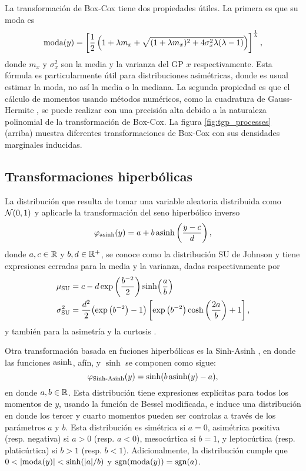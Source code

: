 La transformación de Box-Cox tiene dos propiedades útiles. La primera es que su moda es \cite{powernormal}
\begin{align*}
	\operatorname{moda}(y) = \left[\frac{1}{2} \left(1 + \lambda m_x + \sqrt{(1 + \lambda m_x)^{2} + 4 \sigma_x^2 \lambda (\lambda - 1)}\right)\right]^{\frac{1}{\lambda}},
\end{align*}
donde \(m_x\) y \(\sigma_x^2\) son la media y la varianza del GP \(x\) respectivamente. Esta fórmula es particularmente útil para distribuciones asimétricas, donde es usual estimar la moda, no así la media o la mediana. La segunda propiedad es que el cálculo de momentos usando métodos numéricos, como la cuadratura de Gauss-Hermite \cite{gausshermite64}, se puede realizar con una precisión alta debido a la naturaleza polinomial de la transformación de Box-Cox. La figura \ref{fig:tgp_processes} (arriba) muestra diferentes transformaciones de Box-Cox con sus densidades marginales inducidas.

\subsection{Transformaciones hiperbólicas}
La distribución que resulta de tomar una variable aleatoria distribuida como \(\mathcal{N}(0, 1)\) y aplicarle la transformación del seno hiperbólico inverso
\begin{align}
	\label{eq:arcsinh-trans}
	\varphi_{\operatorname{asinh}}(y) = a + b \operatorname{asinh}\left(\frac{y - c}{d}\right),
\end{align}
donde \(a, c \in \mathbb{R}\) y \(b, d \in \mathbb{R}^{+}\), se conoce como la distribución SU de Johnson \cite{johnsonsu} y tiene expresiones cerradas para la media y la varianza, dadas respectivamente por
\begin{align*}
	\mu_{\mathrm{SU}}			&= c - d \exp\left(\frac{b^{-2}}{2}\right) \sinh\Bigl(\frac{a}{b}\Bigr)\\
	\sigma_{\mathrm{SU}}^{2}	&= \frac{d^{2}}{2} \bigl(\exp\left(b^{-2}\right) - 1\bigr) \left[\exp\left(b^{-2}\right) \cosh\left(\frac{2a}{b}\right) + 1\right],
\end{align*}
y también para la asimetría y la curtosis \cite{johnsonsu}.

Otra transformación basada en fuciones hiperbólicas es la Sinh-Asinh \cite{Sinharcsinh}, en donde las funciones \(\operatorname{asinh}\), afín, y \(\sinh\) se componen como sigue:
\begin{equation}
	\label{eq:sinharcsinh-trans}
	\varphi_{\text{Sinh-Asinh}}(y) = \sinh(b\operatorname{asinh}(y) - a),
\end{equation}
en donde \(a, b \in \mathbb{R}\). Esta distribución tiene expresiones explícitas para todos los momentos de \(y\), usando la función de Bessel modificada, e induce una distribución en donde los tercer y cuarto momentos pueden ser controlas a través de los parámetros \(a\) y \(b\). Esta distribución es simétrica si \(a = 0\), asimétrica positiva (resp. negativa) si \(a > 0\) (resp. \(a < 0\)), mesocúrtica si \(b = 1\), y leptocúrtica (resp. platicúrtica) si \(b > 1\) (resp. \(b < 1\)). Adicionalmente, la distribución cumple que \(0 < \lvert \operatorname{moda}(y) \rvert < \sinh(\lvert a \rvert / b)\) y \(\operatorname{sgn}(\operatorname{moda}(y)) = \operatorname{sgn}(a)\).

